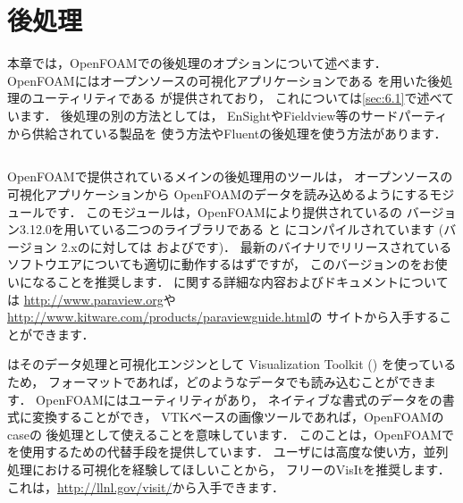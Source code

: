 \chapter{後処理}
\label{chap:6}
%
本章では，OpenFOAMでの後処理のオプションについて述べます．
OpenFOAMにはオープンソースの可視化アプリケーションである
を用いた後処理のユーティリティである
が提供されており，
これについては\autoref{sec:6.1}で述べています．
後処理の別の方法としては，
EnSightやFieldview等のサードパーティから供給されている製品を
使う方法やFluentの後処理を使う方法があります．



\section{}
\label{sec:6.1}
%
%
%
%
%
%
OpenFOAMで提供されているメインの後処理用のツールは，
オープンソースの可視化アプリケーションから
OpenFOAMのデータを読み込めるようにするモジュールです．
このモジュールは，OpenFOAMにより提供されているの
バージョン3.12.0を用いている二つのライブラリである
%
%
と
%
%
にコンパイルされています (バージョン
2.xのに対しては
およびです)．
最新のバイナリでリリースされているソフトウエアについても適切に動作するはずですが，
このバージョンのをお使いになることを推奨します．
に関する詳細な内容およびドキュメントについては
\url{http://www.paraview.org}や
\url{http://www.kitware.com/products/paraviewguide.html}の
サイトから入手することができます．

はそのデータ処理と可視化エンジンとして
Visualization Toolkit () を使っているため，
フォーマットであれば，どのようなデータでも読み込むことができます．
OpenFOAMにはユーティリティがあり，
ネイティブな書式のデータをの書式に変換することができ，
VTKベースの画像ツールであれば，OpenFOAMのcaseの
後処理として使えることを意味しています．
このことは，OpenFOAMでを使用するための代替手段を提供しています．
ユーザには高度な使い方，並列処理における可視化を経験してほしいことから，
フリーのVisItを推奨します．
これは，\url{http://llnl.gov/visit/}から入手できます．

